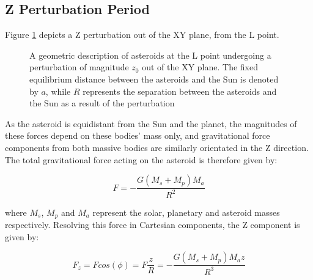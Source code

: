 \documentclass[11pt, a4paper,twocolumn]{article} %
\begin{document}
\onecolumn
\begin{appendices}
\section{Z Perturbation Period} \label{zperiod}
Figure \ref{fig:geometryz} depicts a Z perturbation out of the XY plane, from the L point.
\begin{figure} [h]
	\centering
	\caption{A geometric description of asteroids at the L point undergoing a perturbation of magnitude $z_{0}$ out of the XY plane. The fixed equilibrium distance between the asteroids and the Sun is denoted by $a$, while $R$ represents the separation between the asteroids and the Sun as a result of the perturbation} 
	\label{fig:geometryz}
\end{figure}

As the asteroid is equidistant from the Sun and the planet, the magnitudes of these forces depend on these bodies' mass only, and gravitational force components from both massive bodies are similarly orientated in the Z direction. The total gravitational force acting on the asteroid is therefore given by:

\begin{equation}
F = - \frac{G (M_{s} + M_{p}) M_{a}}{R^{2}}
\end{equation}
	
where $M_{s}$, $M_{p}$ and $M_{a}$ represent the solar, planetary and asteroid masses respectively. Resolving this force in Cartesian components, the Z component is given by:

\begin{equation}
F_{z} = F cos(\phi) = F \frac{z}{R} = - \frac{G (M_{s} + M_{p}) M_{a} z}{R^{3}}
\end{equation}


\end{appendices}
\end{document}
